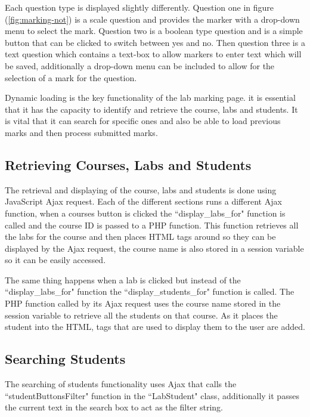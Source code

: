 \documentclass[11pt]{report}
\begin{document}
Each question type is displayed slightly differently. Question one in figure (\ref{fig:marking-not}) is a scale question and provides the marker with a drop-down menu to select the mark. Question two is a boolean type question and is a simple button that can be clicked to switch between yes and no. Then question three is a text question which contains a text-box to allow markers to enter text which will be saved, additionally a drop-down menu can be included to allow for the selection of a mark for the question. 

Dynamic loading is the key functionality of the lab marking page. it is essential that it has the capacity to identify and retrieve the course, labs and students. It is vital  that it can search for specific ones and also be able to load previous marks and then process submitted marks.



\subsection{Retrieving Courses, Labs and Students}

The retrieval and displaying of the course, labs and students is done using JavaScript Ajax request. Each of the different sections runs a different Ajax function, when a courses button is clicked the ``display\_labs\_for" function is called and the course ID is passed to a PHP function. This function retrieves all the labs for the course and then places HTML tags around so they can be displayed by the Ajax request, the course name is also stored in a session variable so it can be easily accessed. 

The same thing happens when a lab is clicked but instead of the ``display\_labs\_for" function the ``display\_students\_for" function is called. The PHP function called by its Ajax request uses the course name stored in the session variable to retrieve all the students on that course. As it places the student into the HTML, tags that are used to display them to the user are added.


\subsection{Searching Students}
The searching of students functionality uses Ajax that calls the ``studentButtonsFilter" function in the ``LabStudent" class, additionally it passes the current text in the search box to act as the filter string. 
\end{document}
